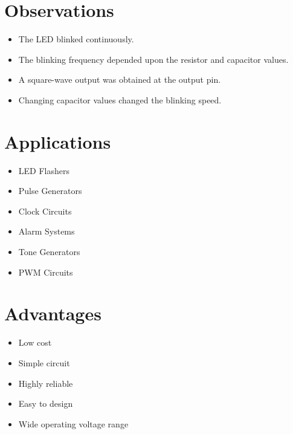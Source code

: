 \documentclass[12pt,a4paper]{report}
\begin{document}
\section{Observations}

\begin{itemize}

\item The LED blinked continuously.

\item The blinking frequency depended upon the resistor and capacitor values.

\item A square-wave output was obtained at the output pin.

\item Changing capacitor values changed the blinking speed.

\end{itemize}

\section{Applications}

\begin{itemize}

\item LED Flashers

\item Pulse Generators

\item Clock Circuits

\item Alarm Systems

\item Tone Generators

\item PWM Circuits

\end{itemize}

\section{Advantages}

\begin{itemize}

\item Low cost

\item Simple circuit

\item Highly reliable

\item Easy to design

\item Wide operating voltage range

\end{itemize}
\end{document}
